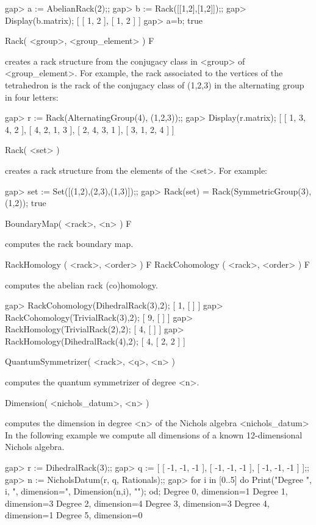\beginexample
gap> a := AbelianRack(2);;
gap> b := Rack([[1,2],[1,2]]);;
gap> Display(b.matrix); 
[ [  1,  2 ],
  [  1,  2 ] ]
gap> a=b;
true
\endexample

\>Rack( <group>, <group_element> ) F

creates a rack structure from the conjugacy class in <group> of 
<group_element>. For example, the rack associated to the 
vertices of the tetrahedron is the rack of the conjugacy class
of (1,2,3) in the alternating group in four letters:

\beginexample
gap> r := Rack(AlternatingGroup(4), (1,2,3));;
gap> Display(r.matrix);
[ [  1,  3,  4,  2 ],
  [  4,  2,  1,  3 ],
  [  2,  4,  3,  1 ],
  [  3,  1,  2,  4 ] ]
\endexample

\>Rack( <set> )

creates a rack structure from the elements of the <set>. For example:

\beginexample
gap> set := Set([(1,2),(2,3),(1,3)]);;
gap> Rack(set) = Rack(SymmetricGroup(3), (1,2));
true
\endexample

\>BoundaryMap( <rack>, <n> ) F 

computes the rack boundary map.

\>RackHomology ( <rack>, <order> ) F
\>RackCohomology ( <rack>, <order> ) F

computes the abelian rack (co)homology. 

\beginexample
gap> RackCohomology(DihedralRack(3),2);
[ 1, [  ] ]
gap> RackCohomology(TrivialRack(3),2); 
[ 9, [  ] ]
gap> RackHomology(TrivialRack(2),2);
[ 4, [  ] ]
gap> RackHomology(DihedralRack(4),2);    
[ 4, [ 2, 2 ] ]
\endexample

\> QuantumSymmetrizer( <rack>, <q>, <n> )

computes the quantum symmetrizer of degree <n>.

\> Dimension( <nichols_datum>, <n> )

computes the dimension in degree <n> of the Nichols algebra <nichols_datum> In
the following example we compute all dimensions of a known 12-dimensional
Nichols algebra.

\beginexample
gap> r := DihedralRack(3);;
gap> q := [ [ -1, -1, -1 ], [ -1, -1, -1 ], [ -1, -1, -1 ] ];;
gap> n := NicholsDatum(r, q, Rationals);;
gap> for i in [0..5] do
Print("Degree ", i, ", dimension=", Dimension(n,i), "\n");
od;
Degree 0, dimension=1
Degree 1, dimension=3
Degree 2, dimension=4
Degree 3, dimension=3
Degree 4, dimension=1
Degree 5, dimension=0
\endexample

